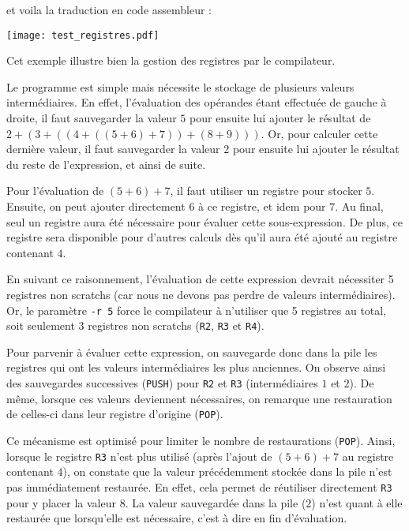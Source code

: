 \documentclass[11pt]{article}
\begin{document}
   et voila la traduction en code assembleur : 

   \texttt{[image: test\_registres.pdf]}

   Cet exemple illustre bien la gestion des registres par le compilateur.

  \hspace{1cm} Le programme est simple mais nécessite le stockage de plusieurs valeurs intermédiaires. En effet, l'évaluation des opérandes étant effectuée de gauche à droite, il faut sauvegarder la valeur $5$ pour ensuite lui ajouter le résultat de $2+(3+((4+((5+6)+7))+(8+9)))$. Or, pour calculer cette dernière valeur, il faut sauvegarder la valeur $2$ pour ensuite lui ajouter le résultat du reste de l'expression, et ainsi de suite.

\hspace{1cm}Pour l'évaluation de $(5+6)+7$, il faut utiliser un registre pour stocker $5$. Ensuite, on peut ajouter directement $6$ à ce registre, et idem pour $7$.
Au final, seul un registre aura été nécessaire pour évaluer cette sous-expression. De plus, ce registre sera disponible pour d'autres calculs dès qu'il aura été ajouté au registre contenant $4$.

\hspace{1cm}En suivant ce raisonnement, l'évaluation de cette expression devrait nécessiter 5 registres non scratchs (car nous ne devons pas perdre de valeurs intermédiaires). Or, le paramètre \verb!-r 5! force le compilateur à n'utiliser que 5 registres au total, soit seulement 3 registres non scratchs (\verb!R2!, \verb!R3! et \verb!R4!).

\hspace{1cm}Pour parvenir à évaluer cette expression, on sauvegarde donc dans la pile les registres qui ont les valeurs intermédiaires les plus anciennes. On observe ainsi des sauvegardes successives (\verb!PUSH!) pour \verb!R2! et \verb!R3! (intermédiaires $1$ et $2$). De même, lorsque ces valeurs deviennent nécessaires, on remarque une restauration de celles-ci dans leur registre d'origine (\verb!POP!).

\hspace{1cm}Ce mécanisme est optimisé pour limiter le nombre de restaurations (\verb!POP!).
Ainsi, lorsque le registre \verb!R3! n'est plus utilisé (après l'ajout de $(5+6)+7$ au registre contenant $4$), on constate que la valeur précédemment stockée dans la pile n'est pas immédiatement restaurée. En effet, cela permet de réutiliser directement \verb!R3! pour y placer la valeur $8$. La valeur sauvegardée dans la pile ($2$) n'est quant à elle restaurée que lorsqu'elle est nécessaire, c'est à dire en fin d'évaluation.
\end{document}
